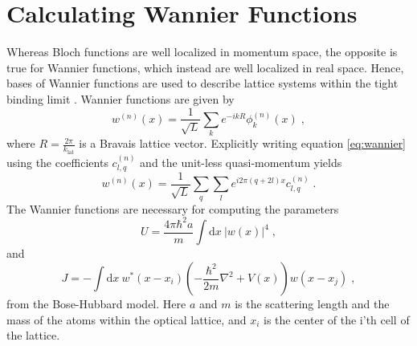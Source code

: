 \section{Calculating Wannier Functions}
Whereas Bloch functions are well localized in momentum space, the opposite is true for Wannier functions, which instead are well localized in real space. Hence, bases of Wannier functions are used to describe lattice systems within the tight binding limit \cite{manybodyBloch}. Wannier functions are given by
\begin{equation}
	w^{(n)}(x) = \frac{1}{\sqrt{L}} \sum_{k} e^{ -i k R } \phi_{k}^{(n)} (x) \; , \label{eq:wannier}
\end{equation}
where $R = \frac{2 \pi}{k_{\mathrm{lat}}}$ is a Bravais lattice vector. Explicitly writing equation \ref{eq:wannier} using the coefficients $c_{l,q}^{(n)}$ and the unit-less quasi-momentum yields
\begin{equation}
	w^{(n)}(x) = \frac{1}{\sqrt{L}} \sum_{q} \sum_{l} e^{ i 2 \pi \left( q + 2 l  \right) x} c_{l,q}^{(n)} \; . \label{eq:wannierrescaled}
\end{equation}
The Wannier functions are necessary for computing the parameters
\begin{equation}
	U = \frac{4 \pi \hbar^2 a}{m} \int \mathrm{d}x \ |w(x)|^4 \; ,
\end{equation}
and 
\begin{equation}
J = - \int \mathrm{d}x \ w^*(x-x_i) \left( - \frac{\hbar^2}{2 m} \nabla ^2 + V(x) \right) w(x-x_j) \; , \label{eq:J}
\end{equation}
from the Bose-Hubbard model. Here $a$ and $m$ is the scattering length and the mass of the atoms within the optical lattice, and $x_i$ is the center of the i'th cell of the lattice. 